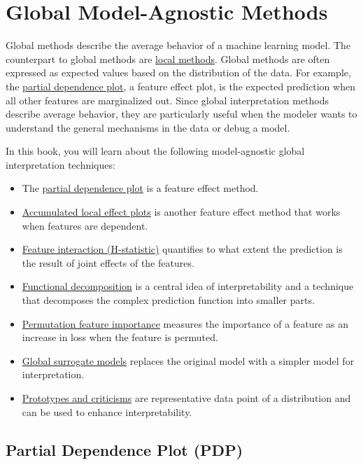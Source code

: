 \documentclass[
  12pt,
]{krantz}
\providecommand{\tightlist}{%
  \setlength{\itemsep}{0pt}\setlength{\parskip}{0pt}}
\begin{document}
\hypertarget{global-methods}{%
\chapter{Global Model-Agnostic Methods}\label{global-methods}}

Global methods describe the average behavior of a machine learning model.
The counterpart to global methods are \protect\hyperlink{local-methods}{local methods}.
Global methods are often expressed as expected values based on the distribution of the data.
For example, the \protect\hyperlink{pdp}{partial dependence plot}, a feature effect plot, is the expected prediction when all other features are marginalized out.
Since global interpretation methods describe average behavior, they are particularly useful when the modeler wants to understand the general mechanisms in the data or debug a model.

In this book, you will learn about the following model-agnostic global interpretation techniques:

\begin{itemize}
\tightlist
\item
  The \protect\hyperlink{pdp}{partial dependence plot} is a feature effect method.
\item
  \protect\hyperlink{ale}{Accumulated local effect plots} is another feature effect method that works when features are dependent.
\item
  \protect\hyperlink{interaction}{Feature interaction (H-statistic)} quantifies to what extent the prediction is the result of joint effects of the features.
\item
  \protect\hyperlink{decompostion}{Functional decomposition} is a central idea of interpretability and a technique that decomposes the complex prediction function into smaller parts.
\item
  \protect\hyperlink{feature-importance}{Permutation feature importance} measures the importance of a feature as an increase in loss when the feature is permuted.
\item
  \protect\hyperlink{global}{Global surrogate models} replaces the original model with a simpler model for interpretation.
\item
  \protect\hyperlink{proto}{Prototypes and criticisms} are representative data point of a distribution and can be used to enhance interpretability.
\end{itemize}

\newpage

\hypertarget{pdp}{%
\section{Partial Dependence Plot (PDP)}\label{pdp}}
\end{document}
